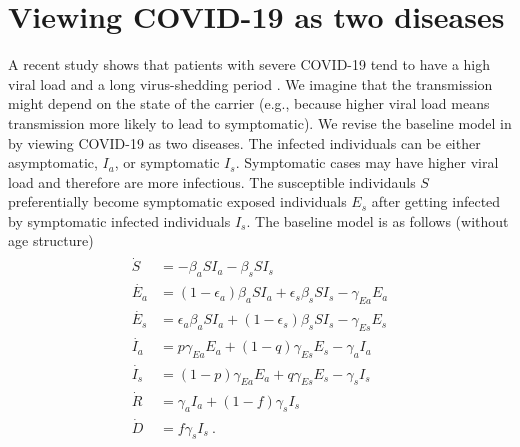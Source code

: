 \documentclass[a4paper,12pt]{article}
\begin{document}
\renewcommand\thesection{\Alph{section}}
\renewcommand\thesubsection{\thesection.\arabic{subsection}}
\newcommand{\norm}[1]{\left\lVert#1\right\rVert}
\newcommand{\Jacb}{\frac{\partial f}{\partial x}} 
\newcommand{\cst}{\mathcal{J}} 
\newcommand{\Ra}{\mathcal{R}_{a}}
\newcommand{\Rs}{\mathcal{R}_{s}}

\newcommand{\Laaa}{\mathcal{L}_{aaa}}
\newcommand{\Lasa}{\mathcal{L}_{asa}}
\newcommand{\Lsss}{\mathcal{L}_{sss}}
\newcommand{\Lsas}{\mathcal{L}_{sas}}

\section{Viewing COVID-19 as two diseases}
A recent study shows that patients with severe COVID-19 tend to have a high viral load and a long virus-shedding period \cite{liu2020viral}. We imagine that the transmission might depend on the state of the carrier (e.g., because higher viral load means transmission more likely to lead to symptomatic). We revise the baseline model in \cite{park2020time} by viewing COVID-19 as two diseases. The infected individuals can be either asymptomatic, $I_{a}$, or symptomatic $I_{s}$. Symptomatic cases may have higher viral load and therefore are more infectious. The susceptible individauls $S$  preferentially become symptomatic exposed individuals $E_{s}$ after getting infected by symptomatic infected individuals $I_{s}$.  The baseline model is as follows (without age structure)
\begin{align}\label{eq: model}
\begin{split}
\dot{S} &= -\beta_{a}SI_{a} -  \beta_{s}SI_{s}\\
\dot{E_{a}} &= (1 - \epsilon_{a})\beta_{a}SI_{a} + \epsilon_{s}\beta_{s}SI_{s}-  \gamma_{Ea}E_{a}\\
\dot{E_{s}} &= \epsilon_{a}\beta_{a}SI_{a} + (1 - \epsilon_{s})\beta_{s}SI_{s} -  \gamma_{Es}E_{s}\\
\dot{I_{a}} &= p\gamma_{Ea}E_{a} + (1 - q)\gamma_{Es}E_{s} - \gamma_{a}I_{a}\\
\dot{I_{s}} &= (1 - p)\gamma_{Ea}E_{a}  + q\gamma_{Es}E_{s} - \gamma_{s}I_{s}\\
\dot{R} &= \gamma_{a}I_{a} + (1 - f)\gamma_{s}I_{s}\\
\dot{D} &= f\gamma_{s}I_{s}\ .
\end{split}
\end{align}
\end{document}
